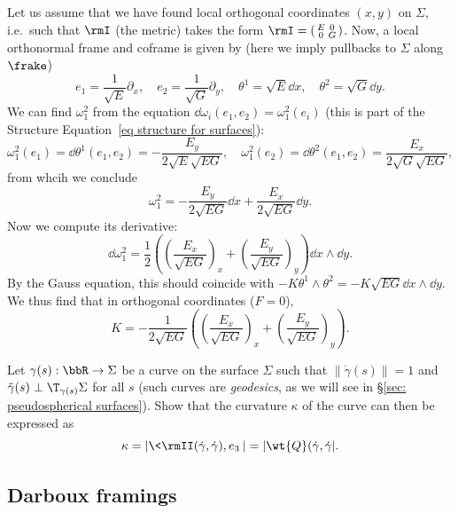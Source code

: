 \begin{example}\label{ex Gauss curvature in orthogonal coords}
    Let us assume that we have found local orthogonal coordinates $(x,y)$ on $\Sigma$, i.e.\ such that $\rmI$ (the metric) takes the form $\rmI=\left(\begin{smallmatrix}
        E & 0\\
        0 & G
    \end{smallmatrix}\right)$.
    Now, a local orthonormal frame and coframe is given by (here we imply pullbacks to $\Sigma$ along $\frake$)
    \[e_1=\frac{1}{\sqrt{E}}\partial_x,\quad e_2=\frac{1}{\sqrt{G}}\partial_y,\quad \theta^1=\sqrt{E}\dd x,\quad \theta^2=\sqrt{G}\dd y.\]
    We can find $\omega_1^2$ from the equation $\dd\omega_i(e_1,e_2)=\omega_1^2(e_i)$ (this is part of the Structure Equation~\ref{eq structure for surfaces}):
    \[\omega_1^2(e_1)=\dd\theta^1(e_1,e_2)=-\frac{E_y}{2\sqrt{E}\sqrt{EG}},\quad \omega_1^2(e_2)=\dd\theta^2(e_1,e_2)=\frac{E_x}{2\sqrt{G}\sqrt{EG}},\]
    from whcih we conclude 
    \[\omega_1^2=-\frac{E_y}{2\sqrt{EG}}\dd x+\frac{E_x}{2\sqrt{EG}}\dd y.\]
    Now we compute its derivative:
    \[\dd\omega_1^2=\frac12\left(\left(\frac{E_x}{\sqrt{EG}}\right)_x+\left(\frac{E_y}{\sqrt{EG}}\right)_y\right)\dd x\wedge\dd y.\]
    By the Gauss equation, this should coincide with $-K\theta^1\wedge\theta^2=-K\sqrt{EG}\dd x\wedge\dd y$. We thus find that in orthogonal coordinates ($F=0$), 
    \[K=-\frac{1}{2\sqrt{EG}}\left(\left(\frac{E_x}{\sqrt{EG}}\right)_x+\left(\frac{E_y}{\sqrt{EG}}\right)_y\right).\label{eq K in orthogonal coords}\]
\end{example}


\begin{xca}
    Let $\gamma(s):\bbR\to \Sigma$ be a curve on the surface $\Sigma$ such that $\lVert\dot\gamma(s)\rVert=1$ and $\ddot\gamma(s)\perp \T_{\gamma(s)}\Sigma$ for all $s$ (such curves are \emph{geodesics}, as we will see in \S\ref{sec: pseudospherical surfaces}). Show that the curvature $\kappa$ of the curve can then be expressed as
    \[\kappa=\left|\<\rmII(\dot\gamma,\dot\gamma),e_3\>\right|=|\wt{Q}(\dot\gamma,\dot\gamma|.\]
\end{xca}











\subsection{Darboux framings}\label{sec: principal framings}


